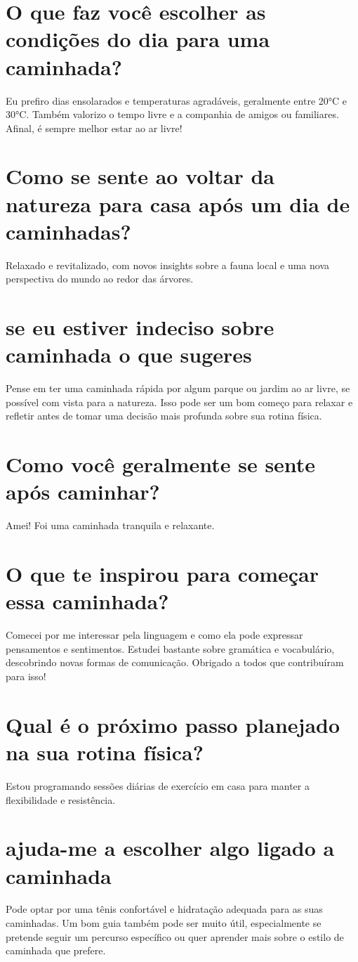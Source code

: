 \documentclass[11pt,a4paper]{article}
\begin{document}
\section{O que faz você escolher as condições do dia para uma caminhada?}
Eu prefiro dias ensolarados e temperaturas agradáveis, geralmente entre 20°C e 30°C. Também valorizo o tempo livre e a companhia de amigos ou familiares. Afinal, é sempre melhor estar ao ar livre!

\section{Como se sente ao voltar da natureza para casa após um dia de caminhadas?}
Relaxado e revitalizado, com novos insights sobre a fauna local e uma nova perspectiva do mundo ao redor das árvores.

\section{se eu estiver indeciso sobre caminhada o que sugeres}
Pense em ter uma caminhada rápida por algum parque ou jardim ao ar livre, se possível com vista para a natureza. Isso pode ser um bom começo para relaxar e refletir antes de tomar uma decisão mais profunda sobre sua rotina física.

\section{Como você geralmente se sente após caminhar?}
Amei! Foi uma caminhada tranquila e relaxante.

\section{O que te inspirou para começar essa caminhada?}
Comecei por me interessar pela linguagem e como ela pode expressar pensamentos e sentimentos. Estudei bastante sobre gramática e vocabulário, descobrindo novas formas de comunicação. Obrigado a todos que contribuíram para isso!

\section{Qual é o próximo passo planejado na sua rotina física?}
Estou programando sessões diárias de exercício em casa para manter a flexibilidade e resistência.

\section{ajuda-me a escolher algo ligado a caminhada}
Pode optar por uma tênis confortável e hidratação adequada para as suas caminhadas. Um bom guia também pode ser muito útil, especialmente se pretende seguir um percurso específico ou quer aprender mais sobre o estilo de caminhada que prefere.
\end{document}
